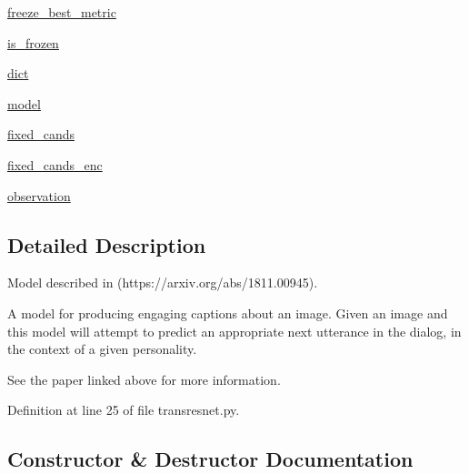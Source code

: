 \begin{DoxyCompactItemize}
\item 
\hyperlink{classprojects_1_1personality__captions_1_1transresnet_1_1transresnet_1_1TransresnetAgent_a9a20b4821c3481f7a08bcc68df5f0fe3}{freeze\+\_\+best\+\_\+metric}
\item 
\hyperlink{classprojects_1_1personality__captions_1_1transresnet_1_1transresnet_1_1TransresnetAgent_a5bdf6e53f546563af9dd552536a5c023}{is\+\_\+frozen}
\item 
\hyperlink{classprojects_1_1personality__captions_1_1transresnet_1_1transresnet_1_1TransresnetAgent_aef1312ff6ea2ee58c245236114d19ecd}{dict}
\item 
\hyperlink{classprojects_1_1personality__captions_1_1transresnet_1_1transresnet_1_1TransresnetAgent_a8bdd596d3dabed6072c814db1f705b82}{model}
\item 
\hyperlink{classprojects_1_1personality__captions_1_1transresnet_1_1transresnet_1_1TransresnetAgent_a08427ced81096471bbe8eaa931c8d029}{fixed\+\_\+cands}
\item 
\hyperlink{classprojects_1_1personality__captions_1_1transresnet_1_1transresnet_1_1TransresnetAgent_a208f000d4bc99419aa38a1f4c86c12d2}{fixed\+\_\+cands\+\_\+enc}
\item 
\hyperlink{classprojects_1_1personality__captions_1_1transresnet_1_1transresnet_1_1TransresnetAgent_adc97f37e227519a48abbfaab4bdd7e92}{observation}
\end{DoxyCompactItemize}


\subsection{Detailed Description}
\begin{DoxyVerb}Model described in (https://arxiv.org/abs/1811.00945).

A model for producing engaging captions about an image. Given an image and
this model will attempt to predict an appropriate
next utterance in the dialog, in the context of a given personality.

See the paper linked above for more information.
\end{DoxyVerb}
 

Definition at line 25 of file transresnet.\+py.



\subsection{Constructor \& Destructor Documentation}
\mbox{\label{classprojects_1_1personality__captions_1_1transresnet_1_1transresnet_1_1TransresnetAgent_a0ef5e4216cb586b31414df5c0992269d}} 
